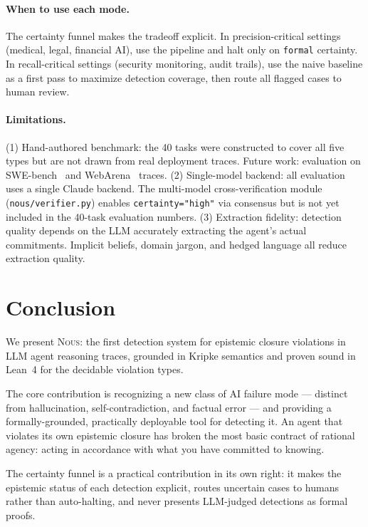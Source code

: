 \documentclass[11pt]{article}
\newcommand{\nous}{\textsc{Nous}} %
\begin{document}
\paragraph{When to use each mode.}
The certainty funnel makes the tradeoff explicit. In precision-critical
settings (medical, legal, financial AI), use the pipeline and halt only on
\texttt{formal} certainty. In recall-critical settings (security monitoring,
audit trails), use the naive baseline as a first pass to maximize detection
coverage, then route all flagged cases to human review.

\paragraph{Limitations.}
(1) Hand-authored benchmark: the 40 tasks were constructed to cover all
five types but are not drawn from real deployment traces.
Future work: evaluation on SWE-bench~\citep{swebench2024} and
WebArena~\citep{webarena2024} traces.
(2) Single-model backend: all evaluation uses a single Claude backend.
The multi-model cross-verification module (\texttt{nous/verifier.py})
enables \texttt{certainty="high"} via consensus but is not yet included
in the 40-task evaluation numbers.
(3) Extraction fidelity: detection quality depends on the LLM accurately
extracting the agent's actual commitments. Implicit beliefs, domain
jargon, and hedged language all reduce extraction quality.

\section{Conclusion}
\label{sec:conclusion}

We present \nous{}: the first detection system for epistemic closure
violations in LLM agent reasoning traces, grounded in Kripke semantics and
proven sound in Lean~4 for the decidable violation types.

The core contribution is recognizing a new class of AI failure mode —
distinct from hallucination, self-contradiction, and factual error —
and providing a formally-grounded, practically deployable tool for
detecting it. An agent that violates its own epistemic closure has broken
the most basic contract of rational agency: acting in accordance with
what you have committed to knowing.

The certainty funnel is a practical contribution in its own right:
it makes the epistemic status of each detection explicit, routes
uncertain cases to humans rather than auto-halting, and never
presents LLM-judged detections as formal proofs.
\end{document}
